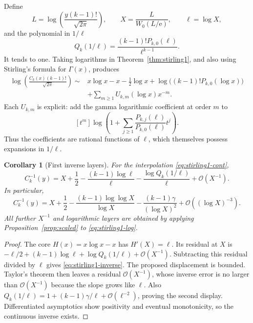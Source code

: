 \documentclass[11pt,a4paper]{article}
\numberwithin{equation}{section}
\newtheorem{corollary}[theorem]{Corollary}
\theoremstyle{definition}
\theoremstyle{remark}
\newcommand{\ee}{\mathrm e}
\newcommand{\bigO}{\mathcal O}
\begin{document}
Define
\begin{equation}
 L=\log\left(\frac{y(k-1)!}{\sqrt{2\pi}}\right),\qquad
 X=\frac{L}{W_0(L/\ee)},\qquad \ell=\log X,
 \label{eq:stirling1-core}
\end{equation}
and the polynomial in $1/\ell$
\begin{equation}
 Q_k(1/\ell)=\frac{(k-1)!P_{k,0}(\ell)}{\ell^{k-1}}.
 \label{eq:stirling1-Q}
\end{equation}
It tends to one. Taking logarithms in Theorem~\ref{thm:stirling1}, and also using Stirling's formula for $\Gamma(x)$, produces
\begin{align}
 \log\left(\frac{C_k(x)(k-1)!}{\sqrt{2\pi}}\right)
 \sim{}&x\log x-x-\tfrac12\log x
       +\log\bigl((k-1)!P_{k,0}(\log x)\bigr)
 \nonumber\\
 &+\sum_{m\ge1}U_{k,m}(\log x)x^{-m}.
 \label{eq:stirling1-log}
\end{align}
Each $U_{k,m}$ is explicit: add the gamma logarithmic coefficient at order $m$ to
\[
 [t^m]\log\left(1+\sum_{j\ge1}
       \frac{P_{k,j}(\ell)}{P_{k,0}(\ell)}t^j\right).
\]
Thus the coefficients are rational functions of $\ell$, which themselves possess expansions in $1/\ell$.

\begin{corollary}[First inverse layers]
\label{cor:stirling1-inverse}
For the interpolation \eqref{eq:stirling1-cont},
\begin{equation}
 C_k^{-1}(y)=X+\frac12
       -\frac{(k-1)\log\ell}{\ell}
       -\frac{\log Q_k(1/\ell)}{\ell}
       +\bigO(X^{-1}).
 \label{eq:stirling1-inverse}
\end{equation}
In particular,
\begin{equation}
 C_k^{-1}(y)=X+\frac12-
       \frac{(k-1)\log\log X}{\log X}
       -\frac{(k-1)\gamma}{(\log X)^2}
       +\bigO((\log X)^{-3}).
 \label{eq:stirling1-inverse-expanded}
\end{equation}
All further $X^{-1}$ and logarithmic layers are obtained by applying Proposition~\ref{prop:scaled} to \eqref{eq:stirling1-log}.
\end{corollary}
\begin{proof}
The core $H(x)=x\log x-x$ has $H'(X)=\ell$. Its residual at $X$ is
$-\ell/2+(k-1)\log\ell+\log Q_k(1/\ell)+\bigO(X^{-1})$.
Subtracting this residual divided by $\ell$ gives \eqref{eq:stirling1-inverse}. The proposed displacement is bounded. Taylor's theorem then leaves a residual $\bigO(X^{-1})$, whose inverse error is no larger than $\bigO(X^{-1})$ because the slope grows like $\ell$. Also
$Q_k(1/\ell)=1+(k-1)\gamma/\ell+\bigO(\ell^{-2})$, proving the second display. Differentiated asymptotics show positivity and eventual monotonicity, so the continuous inverse exists.
\end{proof}
\end{document}
